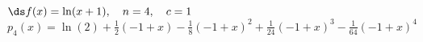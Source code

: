 {$\ds f(x) = \ln (x+1), \quad n=4, \quad c=1$
}
{$p_4(x) = \ln (2)+\frac{1}{2} (-1+x)-\frac{1}{8}
   (-1+x)^2+\frac{1}{24} (-1+x)^3-\frac{1}{64} (-1+x)^4$
}
